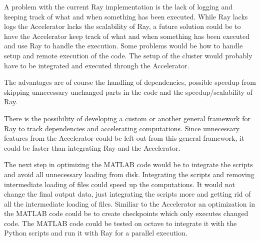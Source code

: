 \documentclass[12pt, a4paper]{article}
\begin{document}
A problem with the current Ray implementation is the lack of logging and keeping track of what and when something has been executed.
While Ray lacks logs the Accelerator lacks the scalability of Ray, a future solution could be to have the Accelerator keep track of what and when something has been executed and use Ray to handle the execution.
Some problems would be how to handle setup and remote execution of the code.
The setup of the cluster would probably have to be integrated and executed through the Accelerator.

The advantages are of course the handling of dependencies, possible speedup from skipping unnecessary unchanged parts in the code and the speedup/scalability of Ray.

There is the possibility of developing a custom or another general framework for Ray to track dependencies and accelerating computations.
Since unnecessary features from the Accelerator could be left out from this general framework, it could be faster than integrating Ray and the Accelerator.

The next step in optimizing the MATLAB code would be to integrate the scripts and avoid all unnecessary loading from disk.
Integrating the scripts and removing intermediate loading of files could speed up the computations.
It would not change the final output data, just integrating the scripts more and getting rid of all the intermediate loading of files.
Similiar to the Accelerator an optimization in the MATLAB code could be to create checkpoints which only executes changed code.
The MATLAB code could be tested on octave to integrate it with the Python scripts and run it with Ray for a parallel execution.



\end{document}
